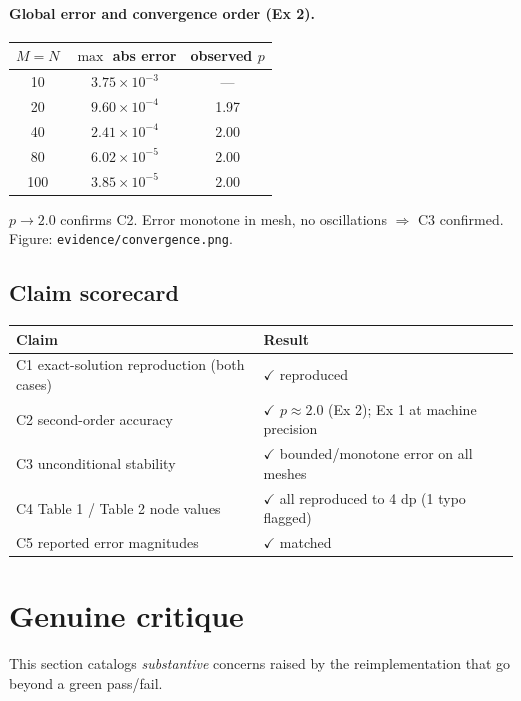 \documentclass[11pt]{article}
\begin{document}
\paragraph{Global error and convergence order (Ex 2).}
\begin{center}
\begin{tabular}{ccc}
\toprule
$M=N$ & $\max$ abs error & observed $p$ \\
\midrule
10 & $3.75\times10^{-3}$ & --- \\
20 & $9.60\times10^{-4}$ & 1.97 \\
40 & $2.41\times10^{-4}$ & 2.00 \\
80 & $6.02\times10^{-5}$ & 2.00 \\
100 & $3.85\times10^{-5}$ & 2.00 \\
\bottomrule
\end{tabular}
\end{center}
$p\to 2.0$ confirms C2. Error monotone in mesh, no oscillations $\Rightarrow$
C3 confirmed. Figure: \texttt{evidence/convergence.png}.

\subsection{Claim scorecard}
\begin{center}
\begin{tabular}{ll}
\toprule
Claim & Result \\
\midrule
C1 exact-solution reproduction (both cases) & $\checkmark$ reproduced \\
C2 second-order accuracy & $\checkmark$ $p\approx 2.0$ (Ex 2); Ex 1 at machine precision \\
C3 unconditional stability & $\checkmark$ bounded/monotone error on all meshes \\
C4 Table 1 / Table 2 node values & $\checkmark$ all reproduced to 4 dp (1 typo flagged) \\
C5 reported error magnitudes & $\checkmark$ matched \\
\bottomrule
\end{tabular}
\end{center}

\section{Genuine critique}\label{sec:critique}
This section catalogs \emph{substantive} concerns raised by the reimplementation
that go beyond a green pass/fail.
\end{document}
